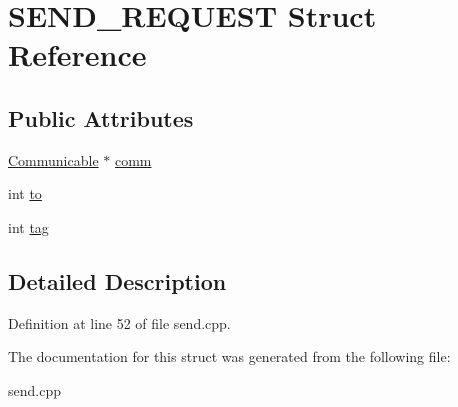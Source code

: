 \hypertarget{structSEND__REQUEST}{
\section{SEND\_\-REQUEST Struct Reference}
\label{structSEND__REQUEST}
}
\subsection*{Public Attributes}
\begin{CompactItemize}
\item 
\hypertarget{structSEND__REQUEST_1ad8f7233fa3ff13262e783a9153920f}{
\hyperlink{classCommunicable}{Communicable} $\ast$ \hyperlink{structSEND__REQUEST_1ad8f7233fa3ff13262e783a9153920f}{comm}}
\label{structSEND__REQUEST_1ad8f7233fa3ff13262e783a9153920f}

\item 
\hypertarget{structSEND__REQUEST_93e2a6a71d2a91aa2b7bdd050ee59b4d}{
int \hyperlink{structSEND__REQUEST_93e2a6a71d2a91aa2b7bdd050ee59b4d}{to}}
\label{structSEND__REQUEST_93e2a6a71d2a91aa2b7bdd050ee59b4d}

\item 
\hypertarget{structSEND__REQUEST_3126b3ef9d6533d3086760e413a7f23f}{
int \hyperlink{structSEND__REQUEST_3126b3ef9d6533d3086760e413a7f23f}{tag}}
\label{structSEND__REQUEST_3126b3ef9d6533d3086760e413a7f23f}

\end{CompactItemize}


\subsection{Detailed Description}




Definition at line 52 of file send.cpp.

The documentation for this struct was generated from the following file:\begin{CompactItemize}
\item 
send.cpp\end{CompactItemize}
